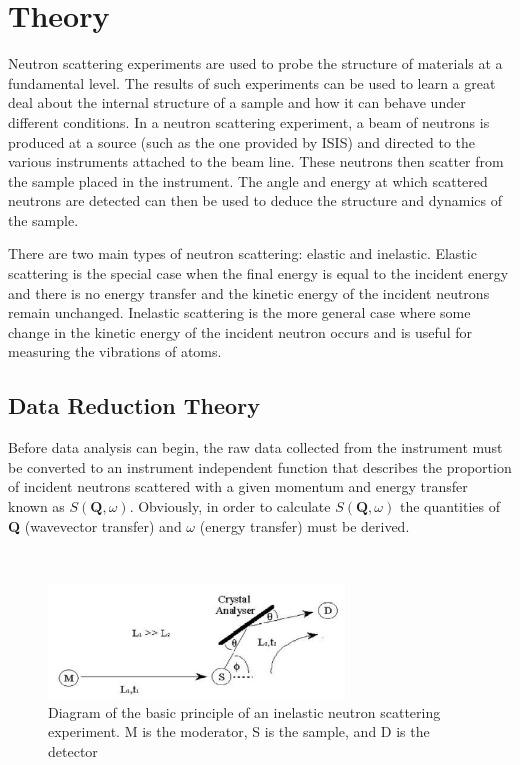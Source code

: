 \documentclass[paper=a4, fontsize=11pt]{scrartcl}	%
\numberwithin{equation}{section}															%
\numberwithin{figure}{section}																%
\numberwithin{table}{section}																%
\begin{document}
\section{Theory}
Neutron scattering experiments are used to probe the structure of materials at a fundamental level. The results of such experiments can be used to learn a great deal about the internal structure of a sample and how it can behave under different conditions. In a neutron scattering experiment, a beam of neutrons is produced at a source (such as the one provided by ISIS) and directed to the various instruments attached to the beam line. These neutrons then scatter from the sample placed in the instrument. The angle and energy at which scattered neutrons are detected can then be used to deduce the structure and dynamics of the sample.

There are two main types of neutron scattering: elastic and inelastic. Elastic scattering is the special case when the final energy is equal to the incident energy and there is no energy transfer and the kinetic energy of the incident neutrons remain unchanged. Inelastic scattering is the more general case where some change in the kinetic energy of the incident neutron occurs and is useful for measuring the vibrations of atoms\cite{rpynn2008}.


\subsection{Data Reduction Theory}
Before data analysis can begin, the raw data collected from the instrument must be converted to an instrument independent function that describes the proportion of incident neutrons scattered with a given momentum and energy transfer known as $S(\mathbf{Q},\omega)$. Obviously, in order to calculate $S(\mathbf{Q},\omega)$ the quantities of \textbf{Q} (wavevector transfer) and $\omega$ (energy transfer) must be derived.

\mbox{ }\\
\begin{figure}[H]
\centering
\includegraphics[width=0.7\textwidth]{img/instrument-diagram.png}
\caption{Diagram of the basic principle of an inelastic neutron scattering experiment. M is the moderator, S is the sample, and D is the detector \cite{smukhopadhyay2014}}
\label{fig:instrument-setup}
\end{figure}
\end{document}
